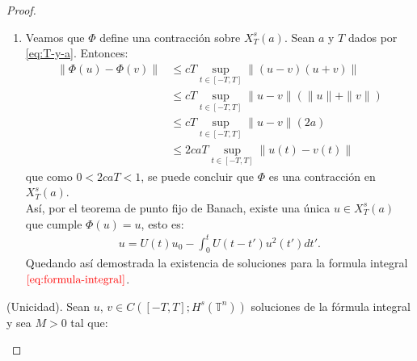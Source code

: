 \begin{proof}
\begin{enumerate}
\begin{enumerate}
\begin{align*}
                            &= \lim_{t \rightarrow t_{1}} \| u_{0} (U(t_{1}) - U(t)) - \int_{t}^{t_{1}} v^{2}(t')(U(t_{1}-t') - U(t-t')) dt' \|_{H^{s}}^2\\
                            &=\lim_{t\to t_1}\|U(t_1)u_0-U(t)u_0\|^2_{H^s}\\
                            &= \lim_{t\to t_1}\sum_{k\in\mathbb{Z}^n}\langle k \rangle^s|\hat{U(t_1)u_0}-\hat{U(t)u_0}|^2\\
                            &=\lim_{t\to t_1}\sum_{k\in \mathbb{Z}^n}\langle k \rangle^s|u_0e^{ik_1|k|^2t}-u_0e^{ik_1|k|^2t_1}|^2\\
                            &=0
                        \end{align*}
                        Ya que la función $e^{ik_1|k|^2t}$ es continua respecto a $t$.\\
                        Lo que nos permite concluir que $\Phi\in C([-T,T];H^s(\mathbb{T}^n))$.
                        \item Veamos que $\Phi$ define una contracción sobre $X_T^s(a)$.
                        Sean $a$ y $T$ dados por \textcolor{red}{\ref{eq:T-y-a}}. Entonces:
                        \begin{align*}
                            \|\Phi(u)-\Phi(v)\| &\leq cT\sup_{t\in[-T,T]}\|(u-v)(u+v)\| \\
                            &\leq cT \sup_{t \in [-T,T]} \| u-v \| (\| u\| + \|v\|)\\
                            & \leq cT \sup_{t \in [-T,T]} \| u-v \| (2a)\\
                            &\leq 2caT \sup_{t \in [-T,T]} \| u(t) - v(t) \|
                        \end{align*}
                        que como $0<2caT<1$, se puede concluir que $\Phi$ es una contracción en $X^{s}_{T} (a)$.\\
                        Así, por el teorema de punto fijo de Banach, existe una única $u \in X^{s}_{T} (a) $ que cumple $\Phi (u) = u$, esto es:
                        \begin{align*}
                            u = U(t)u_{0} - \int_{0} ^{t} U(t-t')u^{2}(t')dt'.
                        \end{align*}
                        Quedando así demostrada la existencia de soluciones para la formula integral $\textcolor{red}{\ref{eq:formula-integral}}$.
                    \end{enumerate}
                    (Unicidad).
                        Sean $u$, $v \in C([-T, T]; H^s(\mathbb{T}^n))$ soluciones de la fórmula integral y sea $M > 0$ tal que:

\end{enumerate}
\end{proof}
